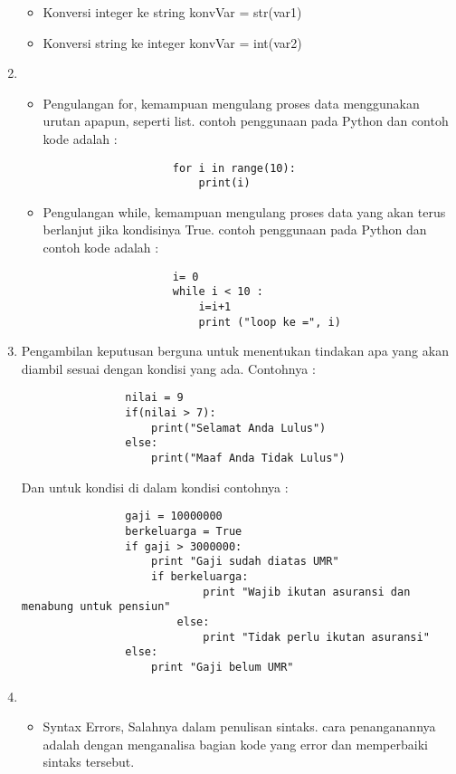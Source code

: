 \begin{enumerate}
\begin{itemize}
					\item Konversi integer ke string
					konvVar = str(var1)
					
					\item Konversi string ke integer
					konvVar = int(var2)
				\end{itemize}

			\item \begin{itemize}
				\item Pengulangan for, kemampuan mengulang proses data menggunakan urutan apapun, seperti list.
				contoh penggunaan pada Python dan contoh kode adalah :

					\begin{verbatim}
					for i in range(10):
						print(i)
					\end{verbatim}
					
				\item Pengulangan while, kemampuan mengulang proses data yang akan terus berlanjut jika kondisinya True.
				contoh penggunaan pada Python dan contoh kode adalah :
					\begin{verbatim}
					i= 0
					while i < 10 :
						i=i+1
						print ("loop ke =", i)
					\end{verbatim}
				\end{itemize}
				
			\item Pengambilan keputusan berguna untuk menentukan tindakan apa yang akan diambil sesuai dengan kondisi yang ada. Contohnya :
				\begin{verbatim}
				nilai = 9
				if(nilai > 7):
					print("Selamat Anda Lulus")
				else:
					print("Maaf Anda Tidak Lulus")
				\end{verbatim}
				
				Dan untuk kondisi di dalam kondisi contohnya :
				
				\begin{verbatim}
				gaji = 10000000
				berkeluarga = True
				if gaji > 3000000:
					print "Gaji sudah diatas UMR"
					if berkeluarga:
							print "Wajib ikutan asuransi dan menabung untuk pensiun"
						else:
							print "Tidak perlu ikutan asuransi"
				else:
					print "Gaji belum UMR"
				\end{verbatim}

			\item \begin{itemize}
					\item Syntax Errors, Salahnya dalam penulisan sintaks.
					cara penanganannya adalah dengan menganalisa bagian kode yang error dan memperbaiki sintaks tersebut.
					

\end{itemize}
\end{enumerate}
